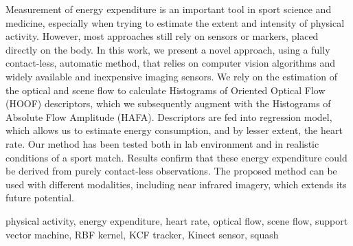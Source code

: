 \abstractp
Measurement of energy expenditure is an important tool in sport science and medicine, especially when trying to estimate the extent and intensity of physical activity. However, most approaches still rely on sensors or markers, placed directly on the body. In this work, we present a novel approach, using a fully contact-less, automatic method, that relies on computer vision algorithms and widely available and inexpensive imaging sensors. We rely on the estimation of the optical and scene flow to calculate Histograms of Oriented Optical Flow (HOOF) descriptors, which we subsequently augment with the Histograms of Absolute Flow Amplitude (HAFA). Descriptors are fed into regression model, which allows us to estimate energy consumption, and by lesser extent, the heart rate. Our method has been tested both in lab environment and in realistic conditions of a sport match. Results confirm that these energy expenditure could be derived from purely contact-less observations. The proposed method can be used with different modalities, including near infrared imagery, which extends its future potential.

\keywords physical activity, energy expenditure, heart rate, optical flow, scene flow, support vector machine, RBF kernel, KCF tracker, Kinect sensor, squash